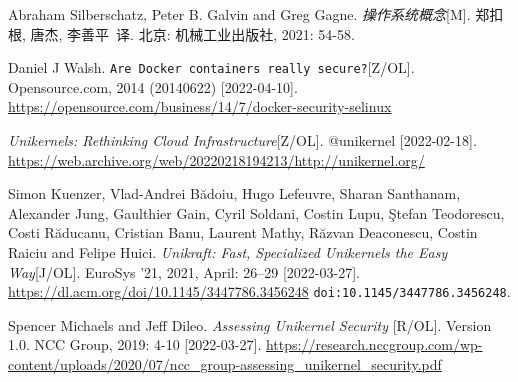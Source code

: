 \documentclass{../runikraft-report}
\begin{document}
\begin{thebibliography}{99}
 Abraham Silberschatz, Peter B. Galvin and Greg Gagne.
\textit{操作系统概念}[M]. 郑扣根, 唐杰, 李善平\ 译. 北京: 机械工业出版社, 2021: 54-58.

 Daniel J Walsh. \texttt{Are Docker containers really secure?}[Z/OL]. Opensource.com, 2014 (20140622) [2022-04-10]. \url{https://opensource.com/business/14/7/docker-security-selinux}

\textit{Unikernels: Rethinking Cloud Infrastructure}[Z/OL].
@unikernel [2022-02-18]. \url{https://web.archive.org/web/20220218194213/http://unikernel.org/}

 Simon Kuenzer, Vlad-Andrei Bădoiu, Hugo Lefeuvre, Sharan Santhanam,
Alexander Jung, Gaulthier Gain, Cyril Soldani, Costin Lupu, \c{S}tefan Teodorescu, Costi Răducanu,
Cristian Banu, Laurent Mathy, Răzvan Deaconescu, Costin Raiciu and Felipe Huici.
\textit{Unikraft: Fast, Specialized Unikernels the Easy Way}[J/OL]. EuroSys '21, 2021, April: 26–29
[2022-03-27]. \url{https://dl.acm.org/doi/10.1145/3447786.3456248} \texttt{doi:10.1145/3447786.3456248}.

 Spencer Michaels and Jeff Dileo. \textit{Assessing Unikernel Security
}[R/OL]. Version 1.0. NCC Group, 2019: 4-10 [2022-03-27].
\url{https://research.nccgroup.com/wp-content/uploads/2020/07/ncc_group-assessing_unikernel_security.pdf}


\end{thebibliography}
\end{document}
